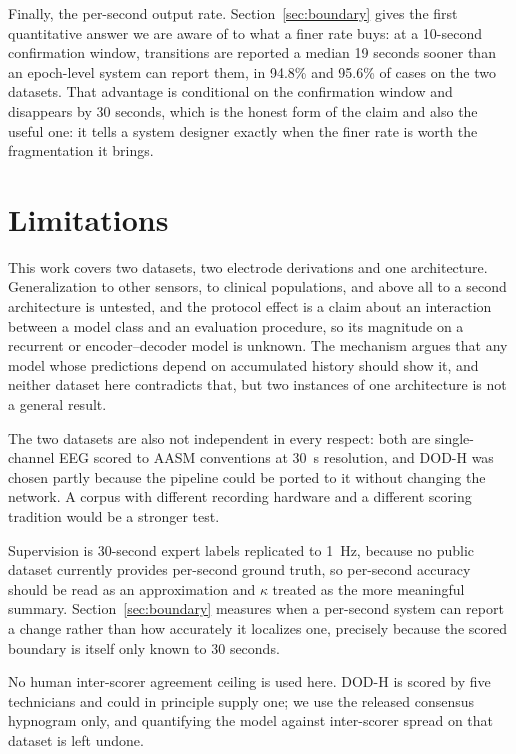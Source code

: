 \documentclass[conference]{IEEEtran}
\begin{document}
Finally, the per-second output rate. Section~\ref{sec:boundary} gives the first quantitative answer
we are aware of to what a finer rate buys: at a 10-second confirmation window, transitions are
reported a median 19 seconds sooner than an epoch-level system can report them, in 94.8\% and 95.6\%
of cases on the two datasets. That advantage is conditional on the confirmation window and
disappears by 30 seconds, which is the honest form of the claim and also the useful one: it tells a
system designer exactly when the finer rate is worth the fragmentation it brings.

\section{Limitations}

This work covers two datasets, two electrode derivations and one architecture. Generalization to
other sensors, to clinical populations, and above all to a second architecture is untested, and the
protocol effect is a claim about an interaction between a model class and an evaluation procedure,
so its magnitude on a recurrent or encoder--decoder model is unknown. The mechanism argues that any
model whose predictions depend on accumulated history should show it, and neither dataset here
contradicts that, but two instances of one architecture is not a general result.

The two datasets are also not independent in every respect: both are single-channel EEG scored to
AASM conventions at 30~s resolution, and DOD-H was chosen partly because the pipeline could be
ported to it without changing the network. A corpus with different recording hardware and a
different scoring tradition would be a stronger test.

Supervision is 30-second expert labels replicated to 1~Hz, because no public dataset currently
provides per-second ground truth, so per-second accuracy should be read as an approximation and
$\kappa$ treated as the more meaningful summary. Section~\ref{sec:boundary} measures when a
per-second system can report a change rather than how accurately it localizes one, precisely because
the scored boundary is itself only known to 30 seconds.

No human inter-scorer agreement ceiling is used here. DOD-H is scored by five technicians and could
in principle supply one; we use the released consensus hypnogram only, and quantifying the model
against inter-scorer spread on that dataset is left undone.
\end{document}

